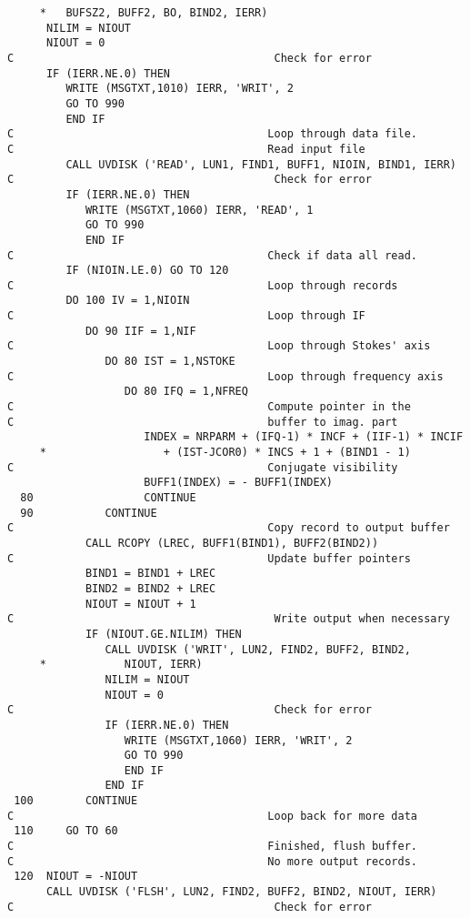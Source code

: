\begin{verbatim}
     *   BUFSZ2, BUFF2, BO, BIND2, IERR)
      NILIM = NIOUT
      NIOUT = 0
C                                        Check for error
      IF (IERR.NE.0) THEN
         WRITE (MSGTXT,1010) IERR, 'WRIT', 2
         GO TO 990
         END IF
C                                       Loop through data file.
C                                       Read input file
         CALL UVDISK ('READ', LUN1, FIND1, BUFF1, NIOIN, BIND1, IERR)
C                                        Check for error
         IF (IERR.NE.0) THEN
            WRITE (MSGTXT,1060) IERR, 'READ', 1
            GO TO 990
            END IF
C                                       Check if data all read.
         IF (NIOIN.LE.0) GO TO 120
C                                       Loop through records
         DO 100 IV = 1,NIOIN
C                                       Loop through IF
            DO 90 IIF = 1,NIF
C                                       Loop through Stokes' axis
               DO 80 IST = 1,NSTOKE
C                                       Loop through frequency axis
                  DO 80 IFQ = 1,NFREQ
C                                       Compute pointer in the
C                                       buffer to imag. part
                     INDEX = NRPARM + (IFQ-1) * INCF + (IIF-1) * INCIF
     *                  + (IST-JCOR0) * INCS + 1 + (BIND1 - 1)
C                                       Conjugate visibility
                     BUFF1(INDEX) = - BUFF1(INDEX)
  80                 CONTINUE
  90           CONTINUE
C                                       Copy record to output buffer
            CALL RCOPY (LREC, BUFF1(BIND1), BUFF2(BIND2))
C                                       Update buffer pointers
            BIND1 = BIND1 + LREC
            BIND2 = BIND2 + LREC
            NIOUT = NIOUT + 1
C                                        Write output when necessary
            IF (NIOUT.GE.NILIM) THEN
               CALL UVDISK ('WRIT', LUN2, FIND2, BUFF2, BIND2,
     *            NIOUT, IERR)
               NILIM = NIOUT
               NIOUT = 0
C                                        Check for error
               IF (IERR.NE.0) THEN
                  WRITE (MSGTXT,1060) IERR, 'WRIT', 2
                  GO TO 990
                  END IF
               END IF
 100        CONTINUE
C                                       Loop back for more data
 110     GO TO 60
C                                       Finished, flush buffer.
C                                       No more output records.
 120  NIOUT = -NIOUT
      CALL UVDISK ('FLSH', LUN2, FIND2, BUFF2, BIND2, NIOUT, IERR)
C                                        Check for error

\end{verbatim}
